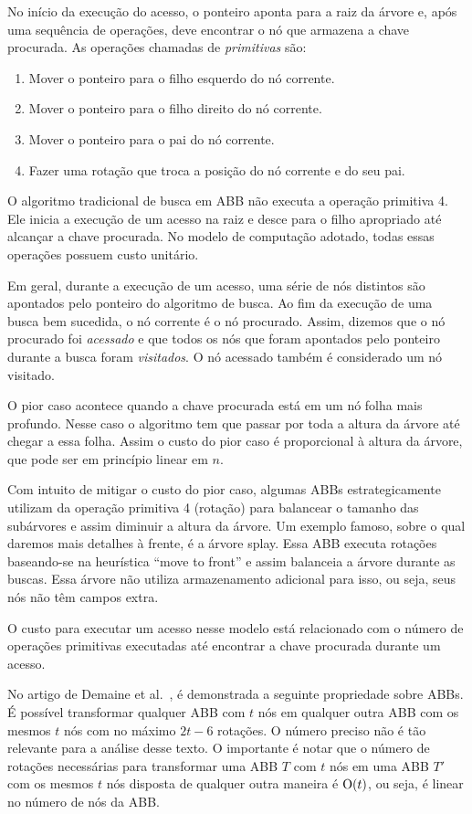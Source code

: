 No início da execução do acesso, o ponteiro aponta para a raiz da árvore e, após uma sequência de operações, deve encontrar o nó que armazena a chave procurada. As operações chamadas de \textit{primitivas} são:
\begin{enumerate}
    \item Mover o ponteiro para o filho esquerdo do nó corrente.
    \item Mover o ponteiro para o filho direito do nó corrente.
    \item Mover o ponteiro para o pai do nó corrente.
    \item Fazer uma rotação que troca a posição do nó corrente e do seu pai.
\end{enumerate}

O algoritmo tradicional de busca em ABB não executa a operação primitiva 4. Ele inicia a execução de um acesso na raiz e desce para o filho apropriado até alcançar a chave procurada. No modelo de computação adotado, todas essas operações possuem custo unitário.

Em geral, durante a execução de um acesso, uma série de nós distintos são apontados pelo ponteiro do algoritmo de busca. Ao fim da execução de uma busca bem sucedida, o nó corrente é o nó procurado. Assim, dizemos que o nó procurado foi \textit{acessado} e que todos os nós que foram apontados pelo ponteiro durante a busca foram \textit{visitados}. O nó acessado também é considerado um nó visitado.

O pior caso acontece quando a chave procurada está em um nó folha mais profundo. Nesse caso o algoritmo tem que passar por toda a altura da árvore até chegar a essa folha. Assim o custo do pior caso é proporcional à altura da árvore, que pode ser em princípio linear em $n$.

Com intuito de mitigar o custo do pior caso, algumas ABBs estrategicamente utilizam da operação primitiva 4 (rotação) para balancear o tamanho das subárvores e assim diminuir a altura da árvore. Um exemplo famoso, sobre o qual daremos mais detalhes à frente, é a árvore splay. Essa ABB executa rotações baseando-se na heurística ``move to front'' e assim balanceia a árvore durante as buscas. Essa árvore não utiliza armazenamento adicional para isso, ou seja, seus nós não têm campos extra.

O custo para executar um acesso nesse modelo está relacionado com o número de operações primitivas executadas até encontrar a chave procurada durante um acesso. 

No artigo de Demaine et al.~\cite{rotation_distance}, é demonstrada a seguinte propriedade sobre ABBs. É possível transformar qualquer ABB com $t$ nós em qualquer outra ABB com os mesmos $t$ nós com no máximo $2t - 6$ rotações. O número preciso não é tão relevante para a análise desse texto. O importante é notar que o número de rotações necessárias para transformar uma ABB $T$ com $t$ nós em uma ABB $T'$ com os mesmos $t$ nós disposta de qualquer outra maneira é $\mathrm{O}(t)$, ou seja, é linear no número de nós da ABB.

